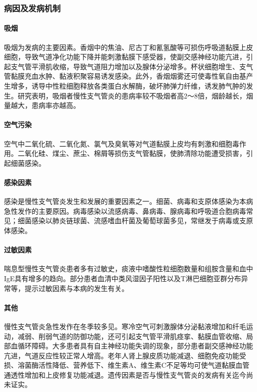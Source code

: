 \subsubsection{病因及发病机制}

\paragraph{吸烟}
吸烟为发病的主要因素。香烟中的焦油、尼古丁和氰氢酸等可损伤呼吸道黏膜上皮细胞，导致气道净化功能下降并能刺激黏膜下感受器，使副交感神经功能亢进，引起支气管平滑肌收缩，导致气道阻力增加以及腺体分泌增多。杯状细胞增生、支气管黏膜充血水肿、黏液积聚容易诱发感染。此外，香烟烟雾还可使毒性氧自由基产生增多，诱导中性粒细胞释放各类蛋白水解酶，破坏肺弹力纤维，诱发肺气肿的发生。研究表明，吸烟者慢性支气管炎的患病率较不吸烟者高2～8倍，烟龄越长，烟量越大，患病率亦越高。

\paragraph{空气污染}
空气中二氧化硫、二氧化氮、氯气及臭氧等对气道黏膜上皮均有刺激和细胞毒作用。二氧化硅、煤尘、蔗尘、棉屑等损伤支气管黏膜，使肺清除功能遭受损害，引起细菌感染。

\paragraph{感染因素}
感染是慢性支气管炎发生和发展的重要因素之一。细菌、病毒和支原体感染为本病急性发作的主要原因。病毒感染以流感病毒、鼻病毒、腺病毒和呼吸道合胞病毒常见；细菌感染以肺炎链球菌、流感嗜血杆菌及葡萄球菌多见，常继发于病毒或支原体感染。

\paragraph{过敏因素}
喘息型慢性支气管炎患者多有过敏史，痰液中嗜酸性粒细胞数量和组胺含量和血中IgE具有增多的趋向。部分患者血清中类风湿因子阳性以及T淋巴细胞亚群分布异常等，提示过敏因素与本病的发生有关。

\paragraph{其他}
慢性支气管炎急性发作在冬季较多见。寒冷空气可刺激腺体分泌黏液增加和纤毛运动，减弱、削弱气道的防御功能，还可引起支气管平滑肌痉挛、黏膜血管收缩、局部血循环障碍。大多患者具有自主神经功能失调的现象，部分患者副交感神经功能亢进，气道反应性较正常人增高。老年人肾上腺皮质功能减退、细胞免疫功能受损、溶菌酶活性降低、营养低下、维生素A、维生素C不足等均可使气道黏膜血管通透性增加和上皮修复功能减退。遗传因素是否与慢性支气管炎的发病有关迄今尚未证实。

